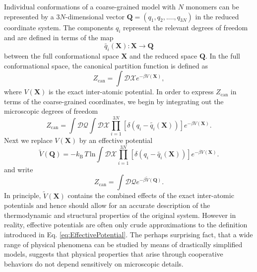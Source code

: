 \documentclass[12pt]{report}
\begin{document}
Individual conformations of a coarse-grained model with $N$ monomers can be represented by a $3N$-dimensional vector $\mathbf{Q} = (q_{1},q_{2},....,q_{3N})$ in the reduced coordinate system. The components $q_{i}$ represent the relevant degrees of freedom and are defined in terms of the map 
%
\begin{equation}
\tilde{q_{i}}(\textbf{X}): \textbf{X} \rightarrow \textbf{Q} 
\end{equation}
%
between the full conformational space $\mathbf{X}$ and the reduced space $\mathbf{Q}$. In the full conformational space, the canonical partition function is defined as
%
\begin{equation}
Z_{\mathrm{can}} = \int \mathcal{DX}e^{-\beta V(\mathbf{X})},
\end{equation}
%
where $V(\mathbf{X})$ is the exact inter-atomic potential. In order to express $Z_{\mathrm{can}}$ in terms of the coarse-grained coordinates, we begin by integrating out the microscopic degrees of freedom
%
\begin{equation}
Z_{\mathrm{can}} = \int \mathcal{DQ}\int \mathcal{DX}\prod _{i = 1}^{3N} \left[\delta (q_{i} - \tilde{q_{i}}(\mathbf{X}))\right]e^{-\beta V(\mathbf{X})}.
\end{equation}
Next we replace $V(\mathbf{X})$ by an effective potential
%
\begin{equation}
\label{eq:EffectivePotential}
\tilde{V}(\mathbf{Q}) = -k_{\mathrm{B}}\,T\,\mathrm{ln} \int \mathcal{DX}\prod_{i = 1}^{3N} \left[\delta (q_{i} - \tilde{q_{i}}(\mathbf{X}))\right]e^{-\beta V(\mathbf{X})}.
\end{equation}
%
and write
%
\begin{equation}
Z_{\mathrm{can}} = \int \mathcal{DQ}e^{-\beta \tilde{V}(\mathbf{Q})}.
\end{equation}
%
In principle, $\tilde{V}(\mathbf{X})$ contains the combined effects of the exact inter-atomic potentials and hence should allow for an accurate description of the thermodynamic and structural properties of the original system. However in reality, effective potentials are often only crude approximations to the definition introduced in Eq. \ref{eq:EffectivePotential}. The perhaps surprising fact, that a wide range of physical phenomena can be studied by means of drastically simplified models, suggests that physical properties that arise through cooperative behaviors do not depend sensitively on microscopic details.

\newpage

\end{document}
